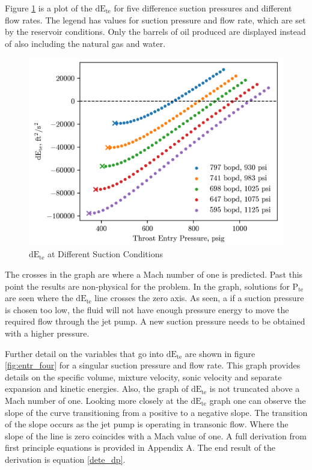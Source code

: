 \documentclass[12 pt]{report}
\newcommand{\dete}{$\mathrm{dE_{te}}$\xspace}  %
\newcommand{\pte}{$\mathrm{P_{te}}$\xspace}  %
\begin{document}
Figure \ref{fig:dete_multi} is a plot of the \dete{} for five difference suction pressures and different flow rates. The legend has values for suction pressure and flow rate, which are set by the reservoir conditions. Only the barrels of oil produced are displayed instead of also including the natural gas and water.

\begin{figure}
    \centering
    \includegraphics[scale=1]{figures/entry_multi.png}
    \caption{\dete at Different Suction Conditions}
    \label{fig:dete_multi}
\end{figure}

The crosses in the graph are where a Mach number of one is predicted. Past this point the results are non-physical for the problem. In the graph, solutions for \pte{} are seen where the \dete{} line crosses the zero axis. As seen, a if a suction pressure is chosen too low, the fluid will not have enough pressure energy to move the required flow through the jet pump. A new suction pressure needs to be obtained with a higher pressure.

Further detail on the variables that go into \dete{} are shown in figure \ref{fig:entr_four} for a singular suction pressure and flow rate. This graph provides details on the specific volume, mixture velocity, sonic velocity and separate expansion and kinetic energies. Also, the graph of \dete is not truncated above a Mach number of one. Looking more closely at the \dete graph one can observe the slope of the curve transitioning from a positive to a negative slope. The transition of the slope occurs as the jet pump is operating in transonic flow. Where the slope of the line is zero coincides with a Mach value of one. A full derivation from first principle equations is provided in Appendix A. The end result of the derivation is equation \eqref{dete_dp}.
\end{document}
